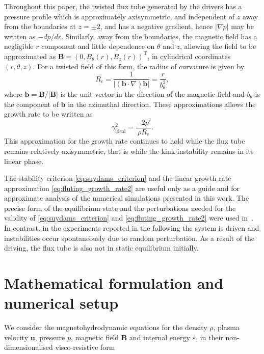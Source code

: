 \documentclass[fleqn,usenatbib]{mnras}
\renewcommand{\vec}[1]{{\bm #1}}
\begin{document}
Throughout this paper, the twisted flux tube generated by the drivers has
a pressure profile which is approximately axisymmetric, and independent of $z$
away from the boundaries at $z=\pm2$, and has a negative gradient, hence
$|\nabla p|$ may be written as $-d p/ dr$. Similarly, away from the boundaries,
the magnetic field has a negligible $r$ component and little dependence on
$\theta$ and $z$, allowing the field to be approximated as $\vec{B} = (0,
B_{\theta}(r), B_z(r))^{\text{T}}$, in cylindrical coordinates $(r, \theta,
z)$. For a twisted field of this form, the radius of curvature is given by
\begin{equation} \label{eq:radius_of_curvature} R_c
= \frac{1}{|(\vec{b}\cdot\nabla) \vec{b}|} = \frac{r}{b_{\theta}^2},
\end{equation} where $\vec{b} = \vec{B}/|\vec{B}|$ is the unit vector in the
direction of the magnetic field and $b_{\theta}$ is the component of $\vec{b}$
in the azimuthal direction. These approximations allows the growth rate to be
written as \begin{equation} \label{eq:fluting_growth_rate2}
\gamma_{\text{ideal}}^2 = \frac{-2p'}{\rho R_c}. \end{equation} This
approximation for the growth rate continues to hold while the flux tube remains
relatively axisymmetric, that is while the kink instability remains in its
linear phase.

The stability criterion \eqref{eq:suydams_criterion} and the linear growth rate
approximation \eqref{eq:fluting_growth_rate2} are useful only as a guide and
for approximate analysis of the numerical simulations presented in this work.
The precise form of the equilibrium state and the perturbations needed for the
validity of \eqref{eq:suydams_criterion} and \eqref{eq:fluting_growth_rate2}
were used in~\citet{quinnEffectAnisotropicViscosity2020}. In contrast, in the
experiments reported in the following the system is driven and instabilities
occur spontaneously due to random perturbation. As a result of the driving, the
flux tube is also not in static equilibrium initially.

\section{Mathematical formulation and numerical setup}
\label{sec-numerical-setup}

We consider the
magnetohydrodynamic equations for the density $\rho$, plasma
velocity $\vec{u}$, pressure $p$, magnetic field $\vec{B}$ and
internal energy $\varepsilon$, in their non-dimensionalised
  visco-resistive form
\end{document}
